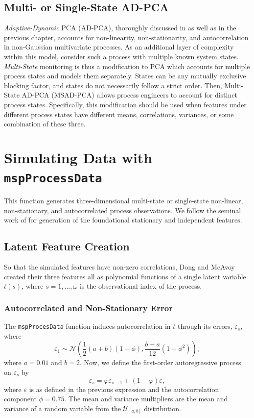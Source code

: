 \documentclass{report}\usepackage[]{graphicx}\usepackage[]{color}
\begin{document}
\subsection{Multi- or Single-State AD-PCA}
\emph{Adaptive-Dynamic} PCA (AD-PCA), thoroughly discussed in \cite{kazor_comparison_2016} as well as in the previous chapter, accounts for non-linearity, non-stationarity, and autocorrelation in non-Gaussian multivariate processes. As an additional layer of complexity within this model, consider such a process with multiple known system states. \emph{Multi-State} monitoring is thus a modification to PCA which accounts for multiple process states and models them separately. States can be any mutually exclusive blocking factor, and states do not necessarily follow a strict order. Then, Multi-State AD-PCA (MSAD-PCA) allows process engineers to account for distinct process states. Specifically, this modification should be used when features under different process states have different means, correlations, variances, or some combination of these three.




\section{Simulating Data with \texttt{mspProcessData}} \label{sec:D_DataGen}
This function generates three-dimensional multi-state or single-state non-linear, non-stationary, and autocorrelated process observations. We follow the seminal work of \cite{dong_batch_1996} for generation of the foundational stationary and independent features.


\subsection{Latent Feature Creation}
So that the simulated features have non-zero correlations, Dong and McAvoy created their three features all as polynomial functions of a single latent variable $t(s)$, where $s = 1, \ldots, \omega$ is the observational index of the process.

\subsubsection{Autocorrelated and Non-Stationary Error}
The \texttt{mspProcesData} function induces autocorrelation in $t$ through its errors, $\varepsilon_s$, where
\[
  \varepsilon_1 \sim \mathcal{N}\left(\frac{1}{2}(a + b)(1 - \phi), \frac{b - a}{12} (1 - \phi ^ 2)\right),
\]
where $a = 0.01$ and $b = 2$. Now, we define the first-order autoregressive process on $\varepsilon_s$ by
\[
  \varepsilon_s = \varphi\varepsilon_{s - 1} + (1 - \varphi)\varepsilon,
\]
where $\varepsilon$ is as defined in the previous expression and the autocorrelation component $\phi = 0.75$. The mean and variance multipliers are the mean and variance of a random variable from the $\mathcal{U}_{[a,b]}$ distribution.
\end{document}
